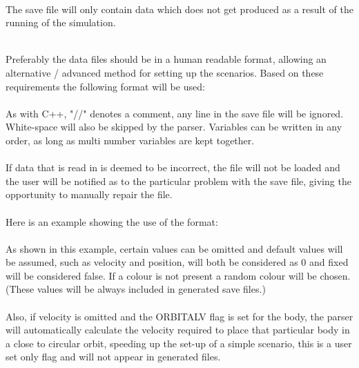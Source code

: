 \paragraph{}
The save file will only contain data which does not get produced as a result of the running of the simulation. \\\

Preferably the data files should be in a human readable format, allowing an alternative / advanced method for setting up the scenarios. Based on these requirements the following format will be used:
\texttt{} 

\paragraph{}
As with C++, "//" denotes a comment, any line in the save file will be ignored. White-space will also be skipped by the parser. Variables can be written in any order, as long as multi number variables are kept together.

\paragraph{}
If data that is read in is deemed to be incorrect, the file will not be loaded and the user will be notified as to the particular problem with the save file, giving the opportunity to manually repair the file.

\paragraph{}
Here is an example showing the use of the format:
\texttt{} 

\paragraph{}
As shown in this example, certain values can be omitted and default values will be assumed, such as velocity and position, will both be considered as 0 and fixed will be considered false. If a colour is not present a random colour will be chosen. (These values will be always included in generated save files.)

\paragraph{}
Also, if velocity is omitted and the ORBITALV flag is set for the body, the parser will automatically calculate the velocity required to place that particular body in a close to circular orbit, speeding up the set-up of a simple scenario, this is a user set only flag and will not appear in generated files.

